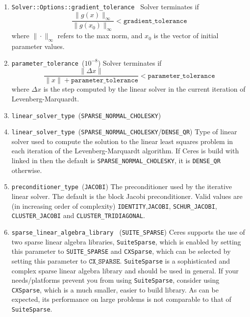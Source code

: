 \begin{enumerate}
\item \texttt{Solver::Options::gradient\_tolerance } Solver terminates if
\begin{equation}
    \frac{\|g(x)\|_\infty}{\|g(x_0)\|_\infty} < \texttt{gradient\_tolerance}
\end{equation}
where $\|\cdot\|_\infty$ refers to the max norm, and $x_0$ is the vector of initial parameter values.

\item{\texttt{parameter\_tolerance }}($10^{-8}$) Solver terminates if
\begin{equation}
    \frac{\|\Delta x\|}{\|x\| + \texttt{parameter\_tolerance}} < \texttt{parameter\_tolerance}
\end{equation}
where $\Delta x$ is the step computed by the linear solver in the current iteration of Levenberg-Marquardt.

\item{\texttt{linear\_solver\_type }(\texttt{SPARSE\_NORMAL\_CHOLESKY})}

\item{\texttt{linear\_solver\_type }}(\texttt{SPARSE\_NORMAL\_CHOLESKY}/\texttt{DENSE\_QR}) Type of linear solver used to compute the solution to the linear least squares problem in each iteration of the Levenberg-Marquardt algorithm. If Ceres is build with \suitesparse linked in  then the default is \texttt{SPARSE\_NORMAL\_CHOLESKY}, it is \texttt{DENSE\_QR} otherwise.

\item{\texttt{preconditioner\_type }}(\texttt{JACOBI}) The preconditioner used by the iterative linear solver. The default is the block Jacobi preconditioner. Valid values are (in increasing order of complexity) \texttt{IDENTITY},\texttt{JACOBI}, \texttt{SCHUR\_JACOBI}, \texttt{CLUSTER\_JACOBI} and \texttt{CLUSTER\_TRIDIAGONAL}.

\item{\texttt{sparse\_linear\_algebra\_library } (\texttt{SUITE\_SPARSE})} Ceres supports the use of two sparse linear algebra libraries, \texttt{SuiteSparse}, which is enabled by setting this parameter to \texttt{SUITE\_SPARSE} and \texttt{CXSparse}, which can be selected by setting this parameter to $\texttt{CX\_SPARSE}$. \texttt{SuiteSparse} is a sophisticated and complex sparse linear algebra library and should be used in general. If your needs/platforms prevent you from using \texttt{SuiteSparse}, consider using \texttt{CXSparse}, which is a much smaller, easier to build library. As can be expected, its performance on large problems is not comparable to that of \texttt{SuiteSparse}.



\end{enumerate}
